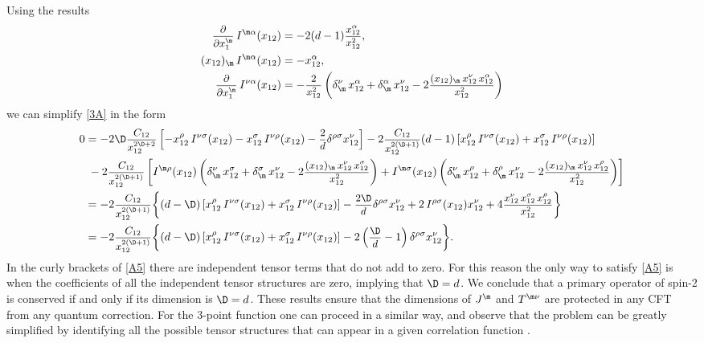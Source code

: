 \documentclass[a4paper,11pt,openright,twoside]{book}
\let\a=\alpha   \let\b=\beta   \let\g=\gamma   \let\d=\delta
\let\n=\nu      \let\x=\xi     \let\p=\pi      \let\r=\rho
\let\s=\sigma  \let\t=\tau     \let\u=\upsilon \let\f=\phi
\newcommand{\sdfrac}[2]{\mbox{\small$\displaystyle\frac{#1}{#2}$}}
\numberwithin{equation}{section}
\begin{document}
Using the results
\begin{align}
	\sdfrac{\partial}{\partial x_1^\m}\,I^{\m\a}(x_{12})&=-2(d-1)\sdfrac{x_{12}^\a}{x_{12}^2},\\
	(x_{12})_{\m}\,I^{\m\a}(x_{12})&=-x_{12}^\a,\\
	\sdfrac{\partial}{\partial x_1^\m}\,I^{\n\a}(x_{12})&=-\sdfrac{2}{x_{12}^2}\left(\d^\n_\m\,x_{12}^\a+\d^\a_\m\,x_{12}^\n-2\sdfrac{(x_{12})_\m\,x_{12}^\n\,x_{12}^\a}{x_{12}^2}\right)
\end{align}
we can simplify \eqref{3A} in the form
\begin{align}
	0&=-2\D\sdfrac{C_{12}}{x_{12}^{2\D+2}}\left[-x_{12}^\r\,I^{\n\s}(x_{12})-x_{12}^\s\,I^{\n\r}(x_{12})-\sdfrac{2}{d}\d^{\r\s}x_{12}^\n\right]-2\sdfrac{C_{12}}{x_{12}^{2(\D+1)}}(d-1)\left[x_{12}^\r\,I^{\n\s}(x_{12})+x_{12}^\s\,I^{\n\r}(x_{12})
	\right]\notag\\
	&\hspace{0.1cm} -2\sdfrac{C_{12}}{x_{12}^{2(\D+1)}}\left[I^{\m\r}(x_{12})\left(\d^\n_\m\,x_{12}^\s+\d^\s_\m\,x_{12}^\n-2\sdfrac{(x_{12})_\m\,x_{12}^\n\,x_{12}^\s}{x_{12}^2}\right)+I^{\m\s}(x_{12})\left(\d^\n_\m\,x_{12}^\r+\d^\r_\m\,x_{12}^\n-2\sdfrac{(x_{12})_\m\,x_{12}^\n\,x_{12}^\r}{x_{12}^2}\right)\right]\notag\\
	&=-2\sdfrac{C_{12}}{x_{12}^{2(\D+1)}}\bigg\{(d-\D)\left[x_{12}^\r\,I^{\n\s}(x_{12})+x_{12}^\s\,I^{\n\r}(x_{12})\right]-\sdfrac{2\D}{d}\d^{\r\s}x_{12}^\n+2\,I^{\r\s}(x_{12})x_{12}^\n+4\sdfrac{x_{12}^\n\,x_{12}^\s\,x_{12}^\r}{x_{12}^2}\bigg\}\notag\\
	&=-2\sdfrac{C_{12}}{x_{12}^{2(\D+1)}}\bigg\{(d-\D)\left[x_{12}^\r\,I^{\n\s}(x_{12})+x_{12}^\s\,I^{\n\r}(x_{12})\right]-2\left(\sdfrac{\D}{d}-1\right)\d^{\r\s}x_{12}^\n\bigg\}.\label{A5}
\end{align}
In the curly brackets of \eqref{A5} there are independent tensor terms that do not add to zero. For this reason the only way to satisfy \eqref{A5} is when the coefficients of all the independent tensor structures are zero, implying that $\D=d$. We conclude that a primary operator of spin-2 is conserved if and only if its dimension is $\D=d$. 
These results ensure that the dimensions of $J^\m$ and $T^{\m\n}$ are protected in any CFT from any quantum correction. 
For the 3-point function one can proceed in a similar way, and observe that the problem can be greatly simplified by identifying all the possible tensor structures that can appear in a given correlation function \cite{Osborn:1993cr,Erdmenger:1996yc,Costa:2011mg}. 
\end{document}
